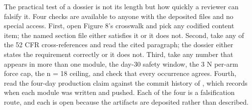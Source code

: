 The practical test of a dossier is not its length but how quickly a reviewer can
falsify it. Four checks are available to anyone with the deposited files and no
special access. First, open Figure 8's crosswalk and pick any codified content
item; the named section file either satisfies it or it does not. Second, take
any of the 52 CFR cross-references and read the cited paragraph; the dossier
either states the requirement correctly or it does not. Third, take any number
that appears in more than one module, the day-30 safety window, the 3 N per-arm
force cap, the n = 18 ceiling, and check that every occurrence agrees. Fourth,
read the four-day production claim against the commit history of
, which records when each module was written and pushed. Each
of the four is a falsification route, and each is open because the artifacts are
deposited rather than described.
